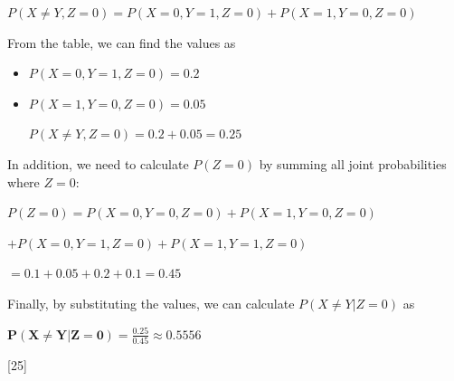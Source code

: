 \documentclass[12pt,letterpaper, onecolumn]{exam}
\begin{document}
\begin{questions}
\begin{parts}
\begin{subparts}
\begin{solution}
                \begin{center}
                    $\displaystyle{P(X \neq Y, Z = 0) = P(X=0, Y=1, Z=0) + P(X=1, Y=0, Z=0)}$
                \end{center}

                From the table, we can find the values as

                \begin{itemize}
                    \item $P(X=0, Y=1, Z=0) = 0.2$
                    \item $P(X=1, Y=0, Z=0) = 0.05$
                    
                \begin{center}
                    $\displaystyle{P(X \neq Y, Z = 0) = 0.2 + 0.05 = 0.25}$
                \end{center}
                \end{itemize}

                In addition, we need to calculate $P(Z=0)$ by summing all joint probabilities where $Z=0$:

                \begin{center}
                    $\displaystyle{P(Z=0) = P(X=0, Y=0, Z=0) + P(X=1, Y=0, Z=0)}$

                    $\displaystyle{+ P(X=0, Y=1, Z=0) + P(X=1, Y=1, Z=0)}$

                    $\displaystyle{= 0.1 + 0.05 + 0.2 + 0.1 = 0.45}$
                \end{center}

                Finally, by substituting the values, we can calculate $P(X \neq Y | Z = 0)$ as

                \begin{center}
                    $\boldsymbol{\displaystyle{P(X \neq Y | Z = 0) = \frac{0.25}{0.45} \approx 0.5556}}$
                \end{center}
                
                
            \end{solution}
            
        \end{subparts}
  
    \end{parts}

    \pagebreak

    [25]


\end{questions}
\end{document}
